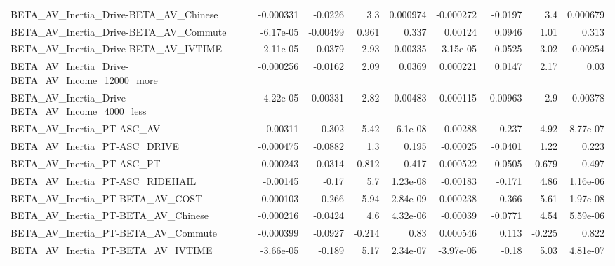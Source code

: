 \begin{tabular}{lrrrrrrrr}
BETA\_AV\_Inertia\_Drive-BETA\_AV\_Chinese              &   -0.000331 &      -0.0226 &      3.3 & 0.000974 &  -0.000272 &     -0.0197 &          3.4 &      0.000679 \\
BETA\_AV\_Inertia\_Drive-BETA\_AV\_Commute              &   -6.17e-05 &     -0.00499 &    0.961 &    0.337 &    0.00124 &      0.0946 &         1.01 &         0.313 \\
BETA\_AV\_Inertia\_Drive-BETA\_AV\_IVTIME               &   -2.11e-05 &      -0.0379 &     2.93 &  0.00335 &  -3.15e-05 &     -0.0525 &         3.02 &       0.00254 \\
BETA\_AV\_Inertia\_Drive-BETA\_AV\_Income\_12000\_more    &   -0.000256 &      -0.0162 &     2.09 &   0.0369 &   0.000221 &      0.0147 &         2.17 &          0.03 \\
BETA\_AV\_Inertia\_Drive-BETA\_AV\_Income\_4000\_less     &   -4.22e-05 &     -0.00331 &     2.82 &  0.00483 &  -0.000115 &    -0.00963 &          2.9 &       0.00378 \\
BETA\_AV\_Inertia\_PT-ASC\_AV                          &    -0.00311 &       -0.302 &     5.42 &  6.1e-08 &   -0.00288 &      -0.237 &         4.92 &      8.77e-07 \\
BETA\_AV\_Inertia\_PT-ASC\_DRIVE                       &   -0.000475 &      -0.0882 &      1.3 &    0.195 &   -0.00025 &     -0.0401 &         1.22 &         0.223 \\
BETA\_AV\_Inertia\_PT-ASC\_PT                          &   -0.000243 &      -0.0314 &   -0.812 &    0.417 &   0.000522 &      0.0505 &       -0.679 &         0.497 \\
BETA\_AV\_Inertia\_PT-ASC\_RIDEHAIL                    &    -0.00145 &        -0.17 &      5.7 & 1.23e-08 &   -0.00183 &      -0.171 &         4.86 &      1.16e-06 \\
BETA\_AV\_Inertia\_PT-BETA\_AV\_COST                    &   -0.000103 &       -0.266 &     5.94 & 2.84e-09 &  -0.000238 &      -0.366 &         5.61 &      1.97e-08 \\
BETA\_AV\_Inertia\_PT-BETA\_AV\_Chinese                 &   -0.000216 &      -0.0424 &      4.6 & 4.32e-06 &   -0.00039 &     -0.0771 &         4.54 &      5.59e-06 \\
BETA\_AV\_Inertia\_PT-BETA\_AV\_Commute                 &   -0.000399 &      -0.0927 &   -0.214 &     0.83 &   0.000546 &       0.113 &       -0.225 &         0.822 \\
BETA\_AV\_Inertia\_PT-BETA\_AV\_IVTIME                  &   -3.66e-05 &       -0.189 &     5.17 & 2.34e-07 &  -3.97e-05 &       -0.18 &         5.03 &      4.81e-07 \\

\end{tabular}
